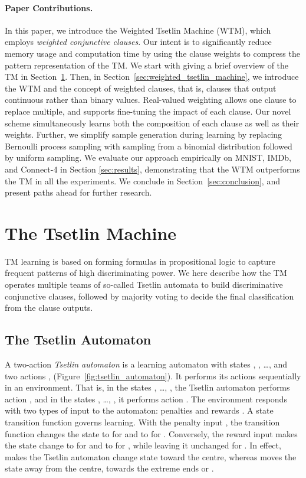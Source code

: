 \documentclass[letterpaper]{article}
\begin{document}
\paragraph{Paper Contributions.} In this paper, we introduce the Weighted Tsetlin Machine (WTM), which employs \emph{weighted conjunctive clauses}. Our intent is to significantly reduce memory usage and computation time by using the clause weights to compress the pattern representation of the TM. We start with giving a brief overview of the TM in Section~\ref{sec:tsetlin_machine}. Then, in Section~\ref{sec:weighted_tsetlin_machine}, we introduce the WTM and the concept of weighted clauses, that is, clauses that output continuous rather than binary values. Real-valued weighting allows one clause to replace multiple, and supports fine-tuning the impact of each clause. Our novel scheme simultaneously learns both the composition of each clause as well as their weights. Further, we simplify sample generation during learning by replacing Bernoulli process sampling with sampling from a binomial distribution followed by uniform sampling. We evaluate our approach empirically on MNIST, IMDb, and Connect-4 in Section \ref{sec:results}, demonstrating that the WTM outperforms the TM in all the experiments. We conclude in Section~\ref{sec:conclusion}, and present paths ahead for further research.

\section{The Tsetlin Machine}
\label{sec:tsetlin_machine}
TM learning is based on forming formulas in propositional logic to capture frequent patterns of high discriminating power. We here describe how the TM operates multiple teams of so-called Tsetlin automata \cite{tsetlin1961behaviour} to build discriminative conjunctive clauses, followed by majority voting to decide the final classification from the clause outputs.
\subsection{The Tsetlin Automaton}
A two-action {\em Tsetlin automaton} \cite{tsetlin1961behaviour,narendra2012learning} is a learning automaton with  states , , \ldots,  and two actions ,  (Figure~\ref{fig:tsetlin_automaton}). It performs its actions sequentially in an environment. That is, in the states , \ldots, , the Tsetlin automaton performs action , and in the states , \ldots, , it performs action . The environment responds with two types of input to the automaton: penalties  and rewards . A state transition function governs learning. With the penalty input , the transition function changes the state  to  for  and to  for . Conversely, the reward input  makes the state  change to  for  and to  for , while leaving it unchanged for . In effect,  makes the Tsetlin automaton change state toward the centre, whereas  moves the state away from the centre, towards the extreme ends  or .
\end{document}
